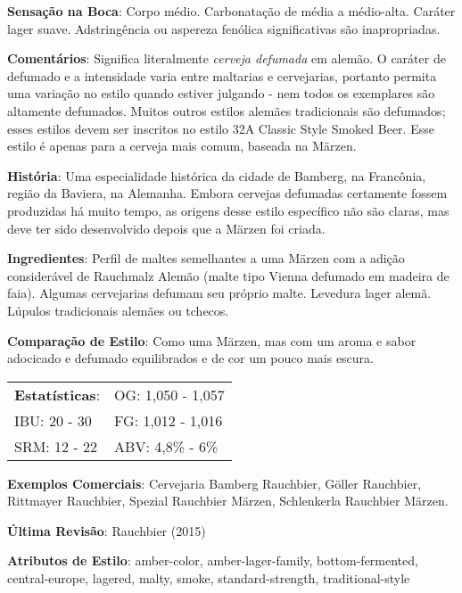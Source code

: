 \textbf{Sensação na Boca}: Corpo médio. Carbonatação de média a médio-alta. Caráter lager suave. Adstringência ou aspereza fenólica significativas são inapropriadas.

\textbf{Comentários}: Significa literalmente \textit{cerveja defumada} em alemão. O caráter de defumado e a intensidade varia entre maltarias e cervejarias, portanto permita uma variação no estilo quando estiver julgando - nem todos os exemplares são altamente defumados. Muitos outros estilos alemães tradicionais são defumados; esses estilos devem ser inscritos no estilo 32A Classic Style Smoked Beer. Esse estilo é apenas para a cerveja mais comum, baseada na Märzen.

\textbf{História}: Uma especialidade histórica da cidade de Bamberg, na Francônia, região da Baviera, na Alemanha. Embora cervejas defumadas certamente fossem produzidas há muito tempo, as origens desse estilo específico não são claras, mas deve ter sido desenvolvido depois que a Märzen foi criada.

\textbf{Ingredientes}: Perfil de maltes semelhantes a uma Märzen com a adição considerável de Rauchmalz Alemão (malte tipo Vienna defumado em madeira de faia). Algumas cervejarias defumam seu próprio malte. Levedura lager alemã. Lúpulos tradicionais alemães ou tchecos.

\textbf{Comparação de Estilo}: Como uma Märzen, mas com um aroma e sabor adocicado e defumado equilibrados e de cor um pouco mais escura.

\begin{tabular}{@{}p{35mm}p{35mm}@{}}
  \textbf{Estatísticas}: & OG: 1,050 - 1,057 \\
  IBU: 20 - 30  & FG: 1,012 - 1,016  \\
  SRM: 12 - 22  & ABV: 4,8\% - 6\%
\end{tabular}

\textbf{Exemplos Comerciais}: Cervejaria Bamberg Rauchbier, Göller Rauchbier, Rittmayer Rauchbier, Spezial Rauchbier Märzen, Schlenkerla Rauchbier Märzen.

\textbf{Última Revisão}: Rauchbier (2015)

\textbf{Atributos de Estilo}: amber-color, amber-lager-family, bottom-fermented, central-europe, lagered, malty, smoke, standard-strength, traditional-style
